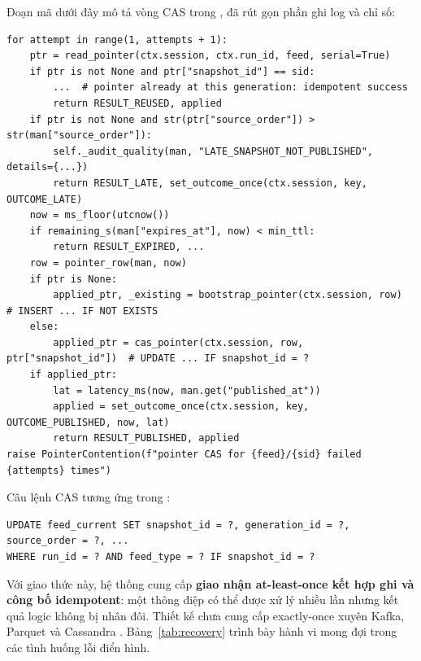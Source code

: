 Đoạn mã dưới đây mô tả vòng CAS trong , đã rút gọn phần ghi log và chỉ số:

\begin{verbatim}
for attempt in range(1, attempts + 1):
    ptr = read_pointer(ctx.session, ctx.run_id, feed, serial=True)
    if ptr is not None and ptr["snapshot_id"] == sid:
        ...  # pointer already at this generation: idempotent success
        return RESULT_REUSED, applied
    if ptr is not None and str(ptr["source_order"]) > str(man["source_order"]):
        self._audit_quality(man, "LATE_SNAPSHOT_NOT_PUBLISHED", details={...})
        return RESULT_LATE, set_outcome_once(ctx.session, key, OUTCOME_LATE)
    now = ms_floor(utcnow())
    if remaining_s(man["expires_at"], now) < min_ttl:
        return RESULT_EXPIRED, ...
    row = pointer_row(man, now)
    if ptr is None:
        applied_ptr, _existing = bootstrap_pointer(ctx.session, row)   # INSERT ... IF NOT EXISTS
    else:
        applied_ptr = cas_pointer(ctx.session, row, ptr["snapshot_id"])  # UPDATE ... IF snapshot_id = ?
    if applied_ptr:
        lat = latency_ms(now, man.get("published_at"))
        applied = set_outcome_once(ctx.session, key, OUTCOME_PUBLISHED, now, lat)
        return RESULT_PUBLISHED, applied
raise PointerContention(f"pointer CAS for {feed}/{sid} failed {attempts} times")
\end{verbatim}

Câu lệnh CAS tương ứng trong :
\begin{verbatim}
UPDATE feed_current SET snapshot_id = ?, generation_id = ?, source_order = ?, ...
WHERE run_id = ? AND feed_type = ? IF snapshot_id = ?
\end{verbatim}

Với giao thức này, hệ thống cung cấp \textbf{giao nhận at-least-once kết hợp ghi và công bố idempotent}: một thông điệp có thể được xử lý nhiều lần nhưng kết quả logic không bị nhân đôi. Thiết kế chưa cung cấp exactly-once xuyên Kafka, Parquet và Cassandra \cite{ddia}. Bảng~\ref{tab:recovery} trình bày hành vi mong đợi trong các tình huống lỗi điển hình.


